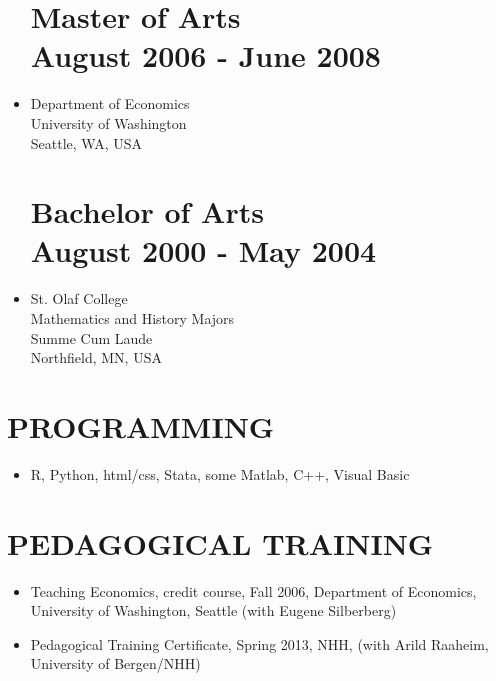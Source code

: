 \documentclass[margin]{res}
\begin{document}
\begin{resume}
\begin{itemize}
\normalsize{\section{\bf Master of Arts \\ August 2006 - June 2008}}
\item[] Department of Economics \\
University of Washington \\
Seattle, WA, USA \\

\normalsize{\section{\bf Bachelor of Arts \\ August 2000 - May 2004}}
\item[] St. Olaf College  \\
Mathematics and History Majors \\
Summe Cum Laude \\
Northfield, MN, USA \\
\end{itemize}

\section{PROGRAMMING}
\begin{itemize}
  \item[] R, Python, html/css, Stata, some Matlab, C++, Visual Basic
\end{itemize}

\section{PEDAGOGICAL TRAINING}
\begin{itemize}
\setlength{\itemsep}{10pt}
\item[] Teaching Economics, credit course, Fall 2006, Department of Economics, University of Washington, Seattle (with Eugene Silberberg)

\item[] Pedagogical Training Certificate, Spring 2013, NHH, (with Arild Raaheim, University of Bergen/NHH)
\end{itemize}



\end{resume}
\end{document}
